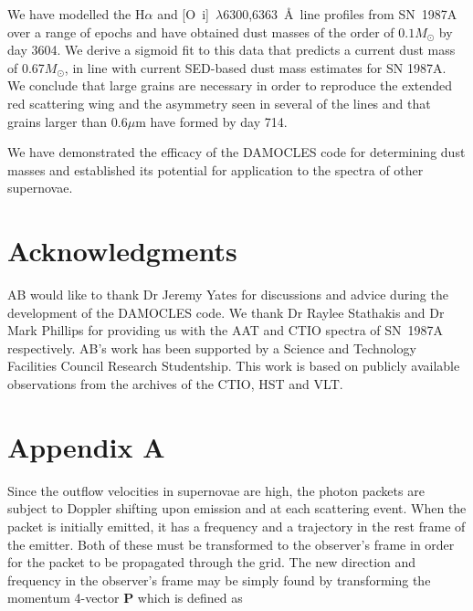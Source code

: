 \documentclass[useAMS,usenatbib,usegraphicx]{mnras}
\begin{document}

We have modelled the H$\alpha$ and [O~{\sc i}]~$\lambda$6300,6363~\AA\ line 
profiles 
from SN~1987A over a range of epochs and have obtained dust masses of the order 
of $0.1M_{\odot}$ by day 3604.  We derive a sigmoid fit to this data that 
predicts a current dust mass of 0.67$M_{\odot}$, in line with current SED-based dust mass estimates for SN 1987A.  We conclude 
that large grains are necessary in order to reproduce the extended red 
scattering wing and the asymmetry seen in several of the lines and that grains 
larger than $0.6\mu$m have formed by day 714.

We have demonstrated the efficacy of the DAMOCLES code for determining 
dust masses and established its potential for application to the spectra of other 
supernovae.


\section*{Acknowledgments}

AB would like to thank Dr Jeremy Yates for discussions and advice during 
the development of the DAMOCLES code.  We thank Dr Raylee Stathakis and Dr Mark Phillips for 
providing us with the AAT and CTIO spectra of SN~1987A respectively.  AB's work has been 
supported by a Science and Technology Facilities Council Research 
Studentship.  This work is based on publicly available observations from the archives of the CTIO, HST and VLT.

{}


\appendix

\section[]{Appendix A}

Since the outflow velocities in supernovae are high, the photon packets 
are subject to Doppler shifting upon emission and at each scattering event.  
When the packet is initially emitted, it has a frequency and a trajectory 
in the rest frame of the emitter. Both of these must be transformed to the 
observer's frame in order for the packet to be propagated through the 
grid.  The new direction and frequency in the observer's frame may be 
simply found by transforming the momentum 4-vector $\mathbf{P}$ which is 
defined as
\end{document}
